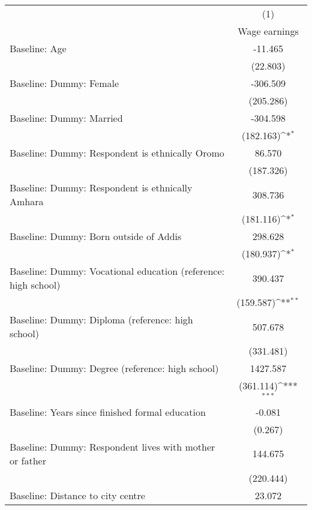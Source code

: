 {
\def\sym#1{\ifmmode^{#1}\else\(^{#1}\)\fi}
\begin{tabular*}{1in}{@{\hskip\tabcolsep\extracolsep\fill}l*{1}{c}}
\hline\hline
                    &\multicolumn{1}{c}{(1)}\\
                    &\multicolumn{1}{c}{Wage earnings}\\
\hline
Baseline: Age       &     -11.465         \\
                    &    (22.803)         \\
[1em]
Baseline: Dummy: Female&    -306.509         \\
                    &   (205.286)         \\
[1em]
Baseline: Dummy: Married&    -304.598         \\
                    &   (182.163)\sym{*}  \\
[1em]
Baseline: Dummy: Respondent is ethnically Oromo&      86.570         \\
                    &   (187.326)         \\
[1em]
Baseline: Dummy: Respondent is ethnically Amhara&     308.736         \\
                    &   (181.116)\sym{*}  \\
[1em]
Baseline: Dummy: Born outside of Addis&     298.628         \\
                    &   (180.937)\sym{*}  \\
[1em]
Baseline: Dummy: Vocational education (reference: high school)&     390.437         \\
                    &   (159.587)\sym{**} \\
[1em]
Baseline: Dummy: Diploma (reference: high school)&     507.678         \\
                    &   (331.481)         \\
[1em]
Baseline: Dummy: Degree (reference: high school)&    1427.587         \\
                    &   (361.114)\sym{***}\\
[1em]
Baseline: Years since finished formal education&      -0.081         \\
                    &     (0.267)         \\
[1em]
Baseline: Dummy: Respondent lives with mother or father&     144.675         \\
                    &   (220.444)         \\
[1em]
Baseline: Distance to city centre&      23.072         \\

\end{tabular*}}
